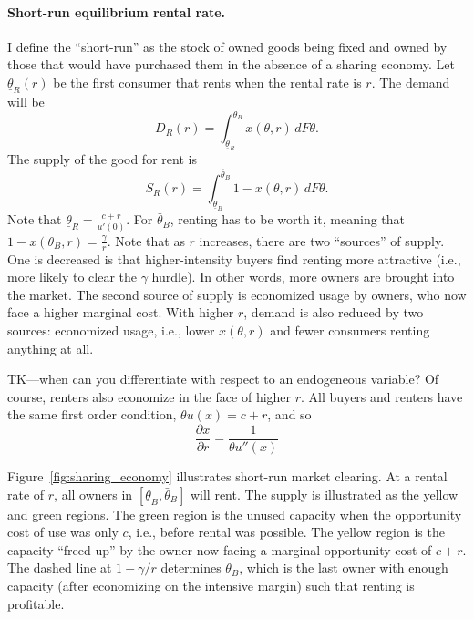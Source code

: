 \documentclass[11pt]{article}
\begin{document}
\paragraph{Short-run equilibrium rental rate.} 
I define the ``short-run'' as the stock of owned goods being fixed and owned by those that would have purchased them in the absence of a sharing economy. 
Let $\underline{\theta}_R(r)$ be the first consumer that rents when the rental rate is $r$. 
The demand will be 
\begin{equation} 
D_R(r) = \int_{\underline{\theta}_R}^{\theta_B} x(\theta, r) \,dF\theta.
\end{equation} 
The supply of the good for rent is 
\begin{equation}
S_R(r) = \int_{\underline{\theta}_B}^{\bar{\theta}_B} 1 - x(\theta, r) \,dF\theta. 
\end{equation} 
Note that $\underline{\theta}_R = \frac{c + r}{u'(0)}$. 
For $\bar{\theta}_B$, renting has to be worth it, meaning that $1 - x(\theta_B, r) = \frac{\gamma}{r}$.
Note that as $r$ increases, there are two ``sources'' of supply. 
One is decreased is that higher-intensity buyers find renting more attractive (i.e., more likely to clear the $\gamma$ hurdle).
In other words, more owners are brought into the market. 
The second source of supply is economized usage by owners, who now face a higher marginal cost.
With higher $r$, demand is also reduced by two sources: economized usage, i.e., lower $x(\theta, r)$ and fewer consumers renting anything at all. 

TK---when can you differentiate with respect to an endogeneous variable? 
Of course, renters also economize in the face of higher $r$. 
All buyers and renters have the same first order condition, $\theta u(x) = c + r$, and so 
\begin{equation} 
\frac{\partial x}{\partial r} = \frac{1}{\theta u''(x)}
\end{equation}  

Figure~\ref{fig:sharing_economy} illustrates short-run market clearing. 
At a rental rate of $r$, all owners in $[\underline{\theta}_B, \bar{\theta}_B]$ will rent. 
The supply is illustrated as the yellow and green regions. 
The green region is the unused capacity when the opportunity cost of use was only $c$, i.e., before rental was possible. 
The yellow region is the capacity ``freed up'' by the owner now facing a marginal opportunity cost of $c + r$.
The dashed line at $1 - \gamma/r$ determines $\bar{\theta}_B$, which is the last owner with enough capacity (after economizing on the intensive margin) such that renting is profitable.  
\end{document}
